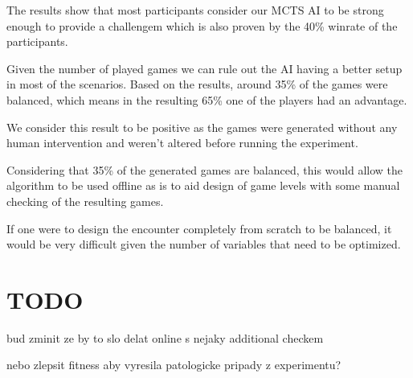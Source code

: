 
The results show that most participants consider our MCTS AI to be strong
enough to provide a challengem which is also proven by the 40\% winrate of
the participants. 

Given the number of played games  we can
rule out the AI having a better setup in most of the scenarios. Based on the
results, around 35\%  of the games were balanced,
which means in the resulting 65\% one of the players had an advantage.

We consider this result to be positive as the games were generated without
any human intervention and weren't altered before running the experiment.

Considering that 35\% of the generated games are balanced, this would allow
the algorithm to be used offline as is to aid design of game levels with
some manual checking of the resulting games.

If one were to design the encounter completely from scratch to be balanced,
it would be very difficult given the number of variables that need to be
optimized.

\section{TODO}

\begin{description}[align=right,labelwidth=3cm]
\item bud zminit ze by to slo delat online s nejaky additional checkem
\item nebo zlepsit fitness aby vyresila patologicke pripady z experimentu?
\end{description}

